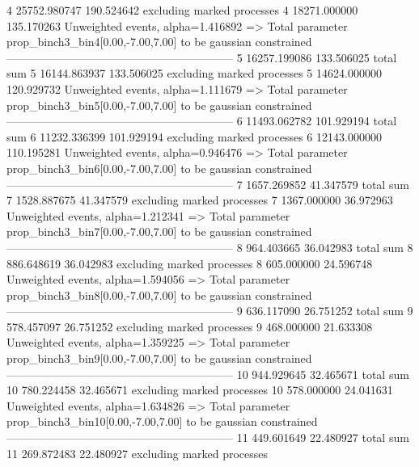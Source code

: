 4          25752.980747    190.524642      excluding marked processes    
4          18271.000000    135.170263      Unweighted events, alpha=1.416892
  => Total parameter prop_binch3_bin4[0.00,-7.00,7.00] to be gaussian constrained
------------------------------------------------------------
5          16257.199086    133.506025      total sum                     
5          16144.863937    133.506025      excluding marked processes    
5          14624.000000    120.929732      Unweighted events, alpha=1.111679
  => Total parameter prop_binch3_bin5[0.00,-7.00,7.00] to be gaussian constrained
------------------------------------------------------------
6          11493.062782    101.929194      total sum                     
6          11232.336399    101.929194      excluding marked processes    
6          12143.000000    110.195281      Unweighted events, alpha=0.946476
  => Total parameter prop_binch3_bin6[0.00,-7.00,7.00] to be gaussian constrained
------------------------------------------------------------
7          1657.269852     41.347579       total sum                     
7          1528.887675     41.347579       excluding marked processes    
7          1367.000000     36.972963       Unweighted events, alpha=1.212341
  => Total parameter prop_binch3_bin7[0.00,-7.00,7.00] to be gaussian constrained
------------------------------------------------------------
8          964.403665      36.042983       total sum                     
8          886.648619      36.042983       excluding marked processes    
8          605.000000      24.596748       Unweighted events, alpha=1.594056
  => Total parameter prop_binch3_bin8[0.00,-7.00,7.00] to be gaussian constrained
------------------------------------------------------------
9          636.117090      26.751252       total sum                     
9          578.457097      26.751252       excluding marked processes    
9          468.000000      21.633308       Unweighted events, alpha=1.359225
  => Total parameter prop_binch3_bin9[0.00,-7.00,7.00] to be gaussian constrained
------------------------------------------------------------
10         944.929645      32.465671       total sum                     
10         780.224458      32.465671       excluding marked processes    
10         578.000000      24.041631       Unweighted events, alpha=1.634826
  => Total parameter prop_binch3_bin10[0.00,-7.00,7.00] to be gaussian constrained
------------------------------------------------------------
11         449.601649      22.480927       total sum                     
11         269.872483      22.480927       excluding marked processes    
